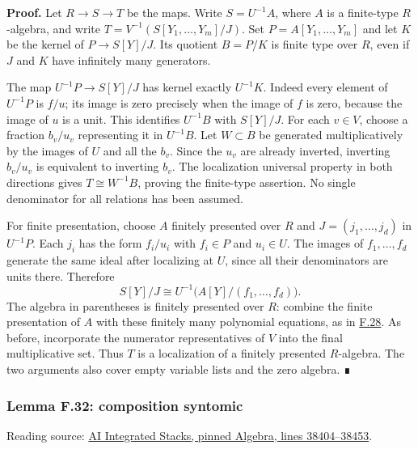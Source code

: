 \documentclass[11pt,a4paper,openany]{report}
\begin{document}
\textbf{Proof.} Let \(R\to S\to T\) be the maps. Write \(S=U^{-1}A\), where \(A\) is a finite-type \(R\)-algebra, and write \(T=V^{-1}(S[Y_1,\ldots,Y_m]/J)\). Set \(P=A[Y_1,\ldots,Y_m]\) and let \(K\) be the kernel of \(P\to S[Y]/J\). Its quotient \(B=P/K\) is finite type over \(R\), even if \(J\) and \(K\) have infinitely many generators.

The map \(U^{-1}P\to S[Y]/J\) has kernel exactly \(U^{-1}K\). Indeed every element of \(U^{-1}P\) is \(f/u\); its image is zero precisely when the image of \(f\) is zero, because the image of \(u\) is a unit. This identifies \(U^{-1}B\) with \(S[Y]/J\). For each \(v\in V\), choose a fraction \(b_v/u_v\) representing it in \(U^{-1}B\). Let \(W\subset B\) be generated multiplicatively by the images of \(U\) and all the \(b_v\). Since the \(u_v\) are already inverted, inverting \(b_v/u_v\) is equivalent to inverting \(b_v\). The localization universal property in both directions gives \(T\cong W^{-1}B\), proving the finite-type assertion. No single denominator for all relations has been assumed.

For finite presentation, choose \(A\) finitely presented over \(R\) and \(J=(j_1,\ldots,j_d)\) in \(U^{-1}P\). Each \(j_i\) has the form \(f_i/u_i\) with \(f_i\in P\) and \(u_i\in U\). The images of \(f_1,\ldots,f_d\) generate the same ideal after localizing at \(U\), since all their denominators are units there. Therefore \[S[Y]/J\cong U^{-1}\bigl(A[Y]/(f_1,\ldots,f_d)\bigr).\] The algebra in parentheses is finitely presented over \(R\): combine the finite presentation of \(A\) with these finitely many polynomial equations, as in \hyperref[AG-RG-S05-algebra-lemma-compose-finite-type]{F.28}. As before, incorporate the numerator representatives of \(V\) into the final multiplicative set. Thus \(T\) is a localization of a finitely presented \(R\)-algebra. The two arguments also cover empty variable lists and the zero algebra. ∎

\label{AG-RG-S05-algebra-lemma-composition-syntomic}

\subsubsection{Lemma F.32: composition syntomic}\label{AG-RG-S05-lemma-f.32-composition-syntomic}

Reading source: \href{https://github.com/KokunoYumeto/unofficial-stacks-project-ai-drafts/blob/565b10e987aba5969b21145a0833f42d69f96790/algebra.tex\#L38404-L38453}{AI Integrated Stacks, pinned Algebra, lines 38404--38453}.
\end{document}
